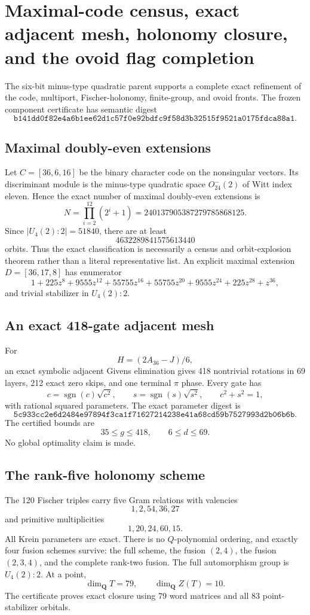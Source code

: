 \section{Maximal-code census, exact adjacent mesh, holonomy closure, and the ovoid flag completion}
\label{sec:bt3821-3828}

The six-bit minus-type quadratic parent supports a complete exact refinement of the code, multiport, Fischer-holonomy, finite-group, and ovoid fronts.  The frozen component certificate has semantic digest
\[
\texttt{b141dd0f82e4a6b1ee62d1c57f0e92bdfc9f58d3b32515f9521a0175fdca88a1}.
\]

\subsection{Maximal doubly-even extensions}
Let $C=[36,6,16]$ be the binary character code on the nonsingular vectors.  Its discriminant module is the minus-type quadratic space $O^-_{24}(2)$ of Witt index eleven.  Hence the exact number of maximal doubly-even extensions is
\[
N=\prod_{i=2}^{12}(2^i+1)
 =240137905387279785868125.
\]
Since $|U_4(2){:}2|=51840$, there are at least
\[
4632289841575613440
\]
orbits.  Thus the exact classification is necessarily a census and orbit-explosion theorem rather than a literal representative list.  An explicit maximal extension $D=[36,17,8]$ has enumerator
\[
1+225z^8+9555z^{12}+55755z^{16}+55755z^{20}
 +9555z^{24}+225z^{28}+z^{36},
\]
and trivial stabilizer in $U_4(2){:}2$.

\subsection{An exact 418-gate adjacent mesh}
For
\[
H=(2A_{36}-J)/6,
\]
an exact symbolic adjacent Givens elimination gives 418 nontrivial rotations in 69 layers, 212 exact zero skips, and one terminal $\pi$ phase.  Every gate has
\[
c=\operatorname{sgn}(c)\sqrt{c^2},\qquad
s=\operatorname{sgn}(s)\sqrt{s^2},\qquad c^2+s^2=1,
\]
with rational squared parameters.  The exact parameter digest is
\[
\texttt{5c933cc2e6d2484e97894f3ca1f71627214238e41a68cd59b7527993d2b06b6b}.
\]
The certified bounds are
\[
35\le g\le418,
\qquad6\le d\le69.
\]
No global optimality claim is made.

\subsection{The rank-five holonomy scheme}
The 120 Fischer triples carry five Gram relations with valencies
\[
1,2,54,36,27
\]
and primitive multiplicities
\[
1,20,24,60,15.
\]
All Krein parameters are exact.  There is no $Q$-polynomial ordering, and exactly four fusion schemes survive: the full scheme, the fusion $(2,4)$, the fusion $(2,3,4)$, and the complete rank-two fusion.  The full automorphism group is $U_4(2){:}2$.  At a point,
\[
\dim_{\mathbf Q}T=79,
\qquad
\dim_{\mathbf Q}Z(T)=10.
\]
The certificate proves exact closure using 79 word matrices and all 83 point-stabilizer orbitals.

